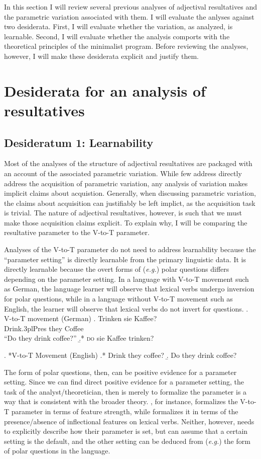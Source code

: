 \documentclass[MilwayThesis]{subfiles}
\begin{document}
In this section I will review several previous analyses of adjectival resultatives and the parametric variation associated with them.
I will evaluate the anlyses against two desiderata.
First, I will evaluate whether the variation, as analyzed, is learnable.
Second, I will evaluate whether the analysis comports with the theoretical principles of the minimalist program.
Before reviewing the analyses, however, I will make these desiderata explicit and justify them.

\section{Desiderata for an analysis of resultatives}

\subsection{Desideratum 1: Learnability}
Most of the analyses of the structure of adjectival resultatives are packaged with an account of the associated parametric variation.
While few address directly address the acquisition of parametric variation, any analysis of variation makes implicit claims about acquistion.
Generally, when discussing parametric variation, the claims about acquisition can justifiably be left implict, as the acquisition task is trivial.
The nature of adjectival resultatives, however, is such that we must make those acquisition claims explicit.
To explain why, I will be comparing the resultative parameter to the V-to-T parameter.

Analyses of the V-to-T parameter do not need to address learnability because the ``parameter setting'' is directly learnable from the primary linguistic data.
It is directly learnable because the overt forms of (\textit{e.g.}) polar questions differs depending on the parameter setting.
In a language with V-to-T movement such as German, the language learner will observe that lexical verbs undergo inversion for polar questions, while in a language without V-to-T movement such as English, the learner will observe that lexical verbs do not invert for questions.
\ex. V-to-T movement (German)
\ag. Trinken sie Kaffee?\\
Drink.3plPres they Coffee\\
``Do they drink coffee?''
\b.* \textsc{do} sie Kaffee trinken?

\ex. *V-to-T Movement (English)
\a.* Drink they coffee?
\b. Do they drink coffee?

The form of polar questions, then, can be positive evidence for a parameter setting.
Since we can find direct positive evidence for a parameter setting, the task of the analyst/theoretician, then is merely to formalize the parameter is a way that is consistent with the broader theory.
\textcite{chomsky1995minimalist}, for instance, formalizes the V-to-T parameter in terms of feature strength, while \textcite{lasnik1999verbal} formalizes it in terms of the presence/absence of inflectional features on lexical verbs.
Neither, however, needs to explicitly describe how their parameter is set, but can assume that a certain setting is the default, and the other setting can be deduced from (\textit{e.g.}) the form of polar questions in the language.
\end{document}
